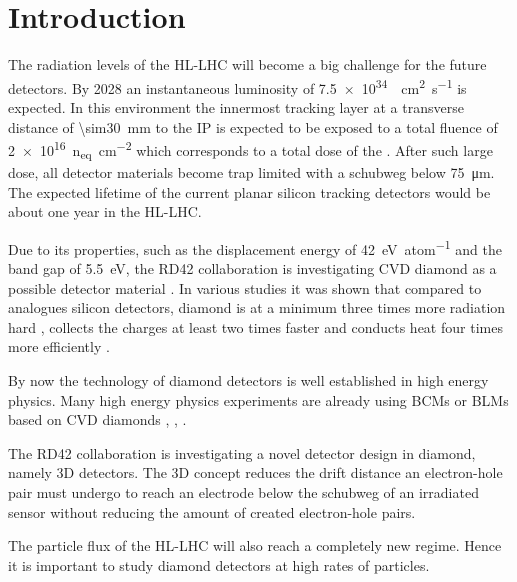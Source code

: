 \section{Introduction}
The radiation levels of the \ac{HL-LHC} will become a big challenge for the future detectors. By 2028 an instantaneous luminosity of \SI{7.5e34}{\per\centi\meter\squared\per\second} is expected. In this environment the innermost tracking layer at a transverse distance of \SI{\sim30}{\milli\meter} to the \acl{IP} is expected to be exposed to a total fluence of \SI{2e16}{n_{eq}\per\centi\meter^2} which corresponds to a total dose of the  \cite{dose}. After such large dose, all detector materials become trap limited with a schubweg below \SI{75}{\micro\meter}.  The expected lifetime of the current planar silicon tracking detectors would be about one year in the \ac{HL-LHC}.\par
Due to its properties, such as the displacement energy of \SI{42}{\electronvolt\per atom} and the band gap of \SI{5.5}{\electronvolt}, the RD42 collaboration is investigating \ac{CVD} diamond as a possible detector material \cite{rd42}. In various studies it was shown that compared to analogues silicon detectors, diamond is at a minimum three times more radiation hard \cite{deboer}, collects the charges at least two times faster \cite{pernegger} and conducts heat four times more efficiently \cite{zhao}.\par
By now the technology of diamond detectors is well established in high energy physics. Many high energy physics experiments are already using \aclp{BCM} or \aclp{BLM} based on \ac{CVD} diamonds \cite{babar}, \cite{bcm}, \cite{dbm1}.\par
The RD42 collaboration is investigating a novel detector design in diamond, namely 3D detectors. The 3D concept reduces the drift distance an electron-hole pair must undergo to reach an electrode below the schubweg of an irradiated sensor without reducing the amount of created electron-hole pairs.\par
The particle flux of the \ac{HL-LHC} will also reach a completely new regime. Hence it is important to study diamond detectors at high rates of particles.
